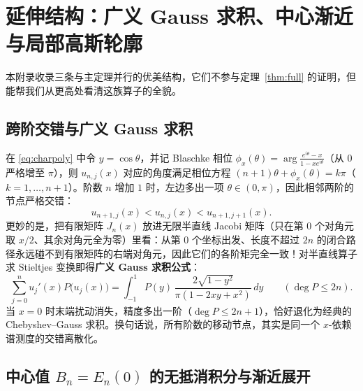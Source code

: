 \documentclass[UTF8,fontset=windows,a4paper,11pt]{ctexart}
\begin{document}
\section{延伸结构：广义 Gauss 求积、中心渐近与局部高斯轮廓}

本附录收录三条与主定理并行的优美结构，它们不参与定理~\ref{thm:full} 的证明，但能帮我们从更高处看清这族算子的全貌。

\subsection{跨阶交错与广义 Gauss 求积}

在 \eqref{eq:charpoly} 中令 $y=\cos\theta$，并记 Blaschke 相位 $\phi_x(\theta)=\arg\frac{e^{i\theta}-x}{1-xe^{i\theta}}$（从 $0$ 严格增至 $\pi$），则 $u_{n,j}(x)$ 对应的角度满足相位方程 $(n+1)\theta+\phi_x(\theta)=k\pi$（$k=1,\dots,n+1$）。阶数 $n$ 增加 $1$ 时，左边多出一项 $\theta\in(0,\pi)$，因此相邻两阶的节点严格交错：
\[
    u_{n+1,j}(x) < u_{n,j}(x) < u_{n+1,j+1}(x).
\]
更妙的是，把有限矩阵 $J_n(x)$ 放进无限半直线 Jacobi 矩阵（只在第 $0$ 个对角元取 $x/2$、其余对角元全为零）里看：从第 $0$ 个坐标出发、长度不超过 $2n$ 的闭合路径永远碰不到有限矩阵的右端对角元，因此它们的各阶矩完全一致！对半直线算子求 Stieltjes 变换即得\textbf{广义 Gauss 求积公式}：
\[
    \sum_{j=0}^{n} u_j'(x)P\bigl(u_j(x)\bigr)
    = \int_{-1}^{1} P(y)\,\frac{2\sqrt{1-y^2}}{\pi(1-2xy+x^2)}\,dy
    \qquad (\deg P\le 2n).
\]
当 $x=0$ 时末端扰动消失，精度多出一阶（$\deg P\le 2n+1$），恰好退化为经典的 Chebyshev--Gauss 求积。换句话说，所有阶数的移动节点，其实是同一个 $x$-依赖谱测度的交错离散化。

\subsection{中心值 $B_n=E_n(0)$ 的无抵消积分与渐近展开}
\end{document}
